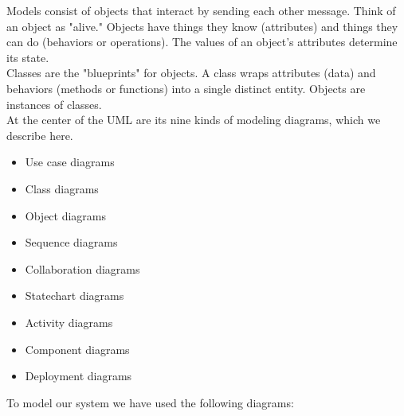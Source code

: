 \hspace*{0.82cm}Models consist of objects that interact by sending each other message. Think of an
object as "alive." Objects have things they know (attributes) and things they can do
(behaviors or operations). The values of an object's attributes determine its state.\\[0.5cm]
\hspace*{0.82cm}Classes are the "blueprints" for objects. A class wraps attributes (data) and behaviors
(methods or functions) into a single distinct entity. Objects are instances of classes.\\[0.5cm]
At the center of the UML are its nine kinds of modeling diagrams, which we describe here.
\begin{itemize}
 \item Use case diagrams
 \item Class diagrams
 \item Object diagrams
 \item Sequence diagrams
 \item Collaboration diagrams
 \item Statechart diagrams
 \item Activity diagrams
 \item Component diagrams
 \item Deployment diagrams
\end{itemize}
To model our system we have used the following diagrams:

